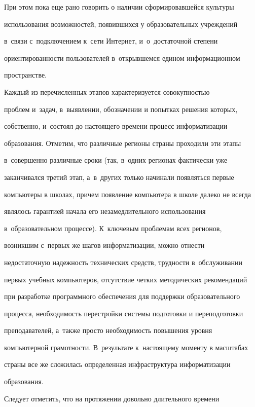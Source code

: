      При этом пока еще рано говорить о наличии сформировавшейся культуры


использования возможностей, появившихся у образовательных учреждений


в~связи с~подключением к~сети Интернет, и~о~достаточной степени


ориентированности пользователей в~открывшемся едином информационном


пространстве.





     Каждый из перечисленных этапов характеризуется совокупностью


проблем и~задач, в~выявлении, обозначении и попытках решения которых,


собственно, и~состоял до настоящего времени процесс информатизации


образования. Отметим, что различные регионы страны проходили эти этапы


в~совершенно различные сроки (так, в~одних регионах фактически уже


заканчивался третий этап, а~в~других только начинали появляться первые


компьютеры в школах, причем появление компьютера в школе далеко не всегда


являлось гарантией начала его незамедлительного использования


в~образовательном процессе). К~ключевым проблемам всех регионов,


возникшим с~первых же шагов информатизации, можно отнести


недостаточную надежность технических средств, трудности в~обслуживании


первых учебных компьютеров, отсутствие четких методических рекомендаций


при разработке программного обеспечения для поддержки образовательного


процесса, необходимость перестройки системы подготовки и переподготовки


преподавателей, а~так\-же просто необходимость повышения уровня


компьютерной грамотности. В~результате к~настоящему моменту в масштабах


страны все же сложилась определенная инфраструктура информатизации


образования.





     Следует отметить, что на протяжении довольно длительного времени


